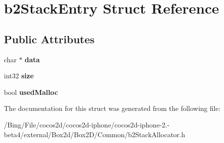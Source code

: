 \hypertarget{structb2_stack_entry}{\section{b2\-Stack\-Entry Struct Reference}
\label{structb2_stack_entry}
}
\subsection*{Public Attributes}
\begin{DoxyCompactItemize}
\item 
\hypertarget{structb2_stack_entry_af98aedeec2c20af0b7d3508a687ddd86}{char $\ast$ {\bfseries data}}\label{structb2_stack_entry_af98aedeec2c20af0b7d3508a687ddd86}

\item 
\hypertarget{structb2_stack_entry_a910c62f05317f8906224b2569e0cb344}{int32 {\bfseries size}}\label{structb2_stack_entry_a910c62f05317f8906224b2569e0cb344}

\item 
\hypertarget{structb2_stack_entry_a581b5e4699bb66a28ec0727497a4e478}{bool {\bfseries used\-Malloc}}\label{structb2_stack_entry_a581b5e4699bb66a28ec0727497a4e478}

\end{DoxyCompactItemize}


The documentation for this struct was generated from the following file\-:\begin{DoxyCompactItemize}
\item 
/\-Bing/\-File/cocos2d/cocos2d-\/iphone/cocos2d-\/iphone-\/2.-\/beta4/external/\-Box2d/\-Box2\-D/\-Common/b2\-Stack\-Allocator.\-h\end{DoxyCompactItemize}
